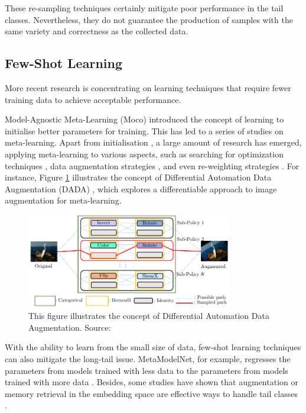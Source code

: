 These re-sampling techniques certainly mitigate poor performance in the tail classes. Nevertheless, they do not guarantee the production of samples with the same variety and correctness as the collected data.

\subsection{Few-Shot Learning}
More recent research is concentrating on learning techniques that require fewer training data to achieve acceptable performance.

Model-Agnostic Meta-Learning (Moco) \parencite{finn2017model} introduced the concept of learning to initialise better parameters for training. This has led to a series of studies on meta-learning. Apart from initialisation \parencite{nichol2018first, 2018Reptile}, a large amount of research has emerged, applying meta-learning to various aspects, such as searching for optimization techniques \parencite{andrychowicz2016learning}, data augmentation strategies \parencite{li2020dada, galashov2022data, cubuk2018autoaugment}, and even re-weighting strategies \parencite{shu2019meta}. For instance, Figure \ref{fig:concetpdada} illustrates the concept of Differential Automation Data Augmentation (DADA) \parencite{li2020dada}, which explores a differentiable approach to image augmentation for meta-learning.

\begin{figure}[ht]
    \centering
    \includegraphics[width=0.8\textwidth]{assets/charts_rw/DADA}
    \caption[Illustration of Differential Automation Data Augmentation]{This figure illustrates the concept of Differential Automation Data Augmentation. Source: \parencite{li2020dada}}
    \label{fig:concetpdada}
\end{figure}

With the ability to learn from the small size of data, few-shot learning techniques can also mitigate the long-tail issue. MetaModelNet, for example, regresses the parameters from models trained with less data to the parameters from models trained with more data \parencite{NIPS2017_147ebe63}. Besides, some studies have shown that augmentation or memory retrieval in the embedding space are effective ways to handle tail classes \parencite{liu2019large, Zhu_2020_CVPR, li2021metasaug, Fu_2022_ACCV}.

